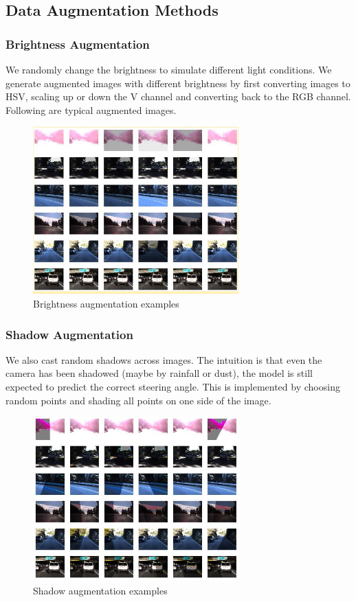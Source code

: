 \documentclass[10pt,twocolumn,letterpaper]{article}
\begin{document}
\subsection{Data Augmentation Methods}

\subsubsection{Brightness Augmentation}
We randomly change the brightness to simulate different light conditions. We generate augmented images with different brightness by first converting images to HSV, scaling up or down the V channel and converting back to the RGB channel. Following are typical augmented images.

\begin{figure}[!htb]
	\includegraphics[width=8cm]{brightness_aug.JPG}
	\centering
	\caption{Brightness augmentation examples}
	\label{bright_aug}
\end{figure}


\subsubsection{Shadow Augmentation}
We also cast random shadows across images. The intuition is that even the camera has been shadowed (maybe by rainfall or dust), the model is still expected to predict the correct steering angle. This is implemented by choosing random points and shading all points on one side of the image.

\begin{figure}[!htb]
	\includegraphics[width=8cm]{shadow_aug.JPG}
	\centering
	\caption{Shadow augmentation examples}
	\label{shadow_aug}
\end{figure}
\end{document}
